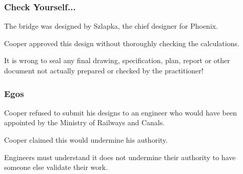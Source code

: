 \begin{frame}
\frametitle{Check Yourself...}

The bridge was designed by Szlapka, the chief designer for Phoenix.

Cooper approved this design without thoroughly checking the calculations.


It is wrong to seal any final drawing, specification, plan, report or other document not actually prepared or checked by the practitioner!


\end{frame}



\begin{frame}
\frametitle{Egos}

Cooper refused to submit his designs to an engineer who would have been appointed by the Ministry of Railways and Canals.

Cooper claimed this would undermine his authority.

Engineers must understand it does not undermine their authority to have someone else validate their work.
\end{frame}



